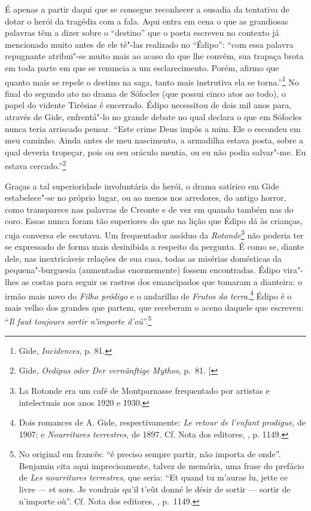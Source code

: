 É apenas a partir daqui que se consegue reconhecer a ousadia da
tentativa de dotar o herói da tragédia com a fala. Aqui entra em cena o
que as grandiosas palavras têm a dizer sobre o ``destino'' que o poeta
escreveu no contexto já mencionado muito antes de ele tê"-las realizado
no ``Édipo'': ``com essa palavra repugnante atribui"-se muito mais ao
acaso do que lhe convém, sua trapaça brota em toda parte em que se
renuncia a um esclarecimento. Porém, afirmo que quanto mais se repele o
destino na saga, tanto mais instrutiva ela se torna.''\footnote{Gide, \emph{Incidences}, p. 81. \versal{[N.~T.]}} No final do segundo ato no drama de %
Sófocles (que possui cinco atos ao todo), o papel do vidente Tirésias é
encerrado. Édipo necessitou de dois mil anos para, através de Gide,
enfrentá"-lo no grande debate no qual declara o que em Sófocles nunca
teria arriscado pensar. ``Este crime Deus impôs a mim. Ele o escondeu em
meu caminho. Ainda antes de meu nascimento, a armadilha estava posta,
sobre a qual deveria tropeçar, pois ou seu oráculo mentia, ou eu não
podia salvar"-me. Eu estava cercado.''\footnote{Gide, \emph{Oedipus oder Der vernünftige Mythos}, p.~81. {[}\versal{N.~T.}{]}}

Graças a tal superioridade involuntária do herói, o drama satírico em
Gide estabelece"-se no próprio lugar, ou ao menos nos arredores, do antigo
horror, como transparece nas palavras de Creonte e de vez em quando
também nas do coro. Essas nunca foram tão superiores do que na lição que
Édipo dá às crianças, cuja conversa ele escutava. Um frequentador
assíduo da \emph{Rotonde}\footnote{La Rotonde era um café de Montparnasse
  frequentado por artistas e intelectuais nos anos 1920 e 1930. \versal{[N.~O.]}} não
poderia ter se expressado de forma mais desinibida a respeito da
pergunta. É como se, diante dele, nas inextricáveis relações de sua
casa, todas as misérias domésticas da pequena"-burguesia (aumentadas
enormemente) fossem encontradas. Édipo vira"-lhes as costas para seguir
os rastros dos emancipados que tomaram a dianteira: o irmão mais novo do
\emph{Filho pródigo} e o andarilho de \emph{Frutos da terra}.\footnote{Dois romances de A. Gide, respectivamente: \emph{Le retour de l'enfant
  prodigue}, de 1907; e \emph{Nourritures terrestres}, de 1897. Cf. Nota
  dos editores, , p. 1149. \versal{[N.~O.]}} Édipo é o
mais velho dos grandes que partem, que receberam o aceno daquele que
escreveu: ``\emph{Il faut toujours sortir n'importe d'où}''.\footnote{No original em francês: ``é preciso sempre partir, não importa de onde''.
  Benjamin cita aqui imprecisamente, talvez de memória, uma frase do
  prefácio de \emph{Les nourritures terrestres}, que seria: ``Et quand
  tu m'auras lu, jette ce livre --- et sors. Je voudrais qu'il t'eût
  donné le désir de sortir --- sortir de n'importe où''. Cf. Nota dos
  editores, , p.~1149. \versal{[N.~T.]}}
